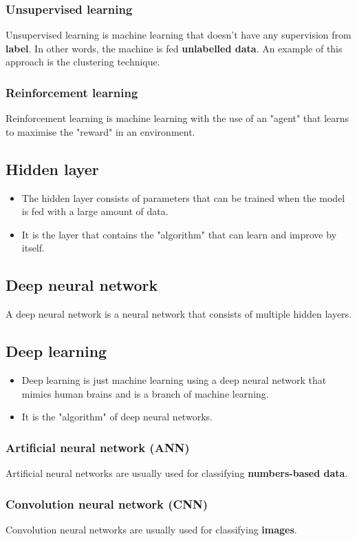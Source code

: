 \documentclass[11pt]{article}
\begin{document}
\subsubsection{Unsupervised learning}
\label{sec:org3e51dc6}
Unsupervised learning is machine learning that doesn't have any supervision from \textbf{label}. In other words, the machine is fed \textbf{unlabelled data}. An example of this approach is the clustering technique.
\subsubsection{Reinforcement learning}
\label{sec:org2c93f9f}
Reinforcement learning is machine learning with the use of an "agent" that learns to maximise the "reward" in an environment.
\subsection{Hidden layer}
\label{sec:org860e4af}
\begin{itemize}
\item The hidden layer consists of parameters that can be trained when the model is fed with a large amount of data.
\item It is the layer that contains the "algorithm" that can learn and improve by itself.
\end{itemize}
\subsection{Deep neural network}
\label{sec:org172271e}
A deep neural network is a neural network that consists of multiple hidden layers.
\subsection{Deep learning}
\label{sec:orgf9fda1c}
\begin{itemize}
\item Deep learning is just machine learning using a deep neural network that mimics human brains and is a branch of machine learning.
\item It is the "algorithm" of deep neural networks.
\end{itemize}
\subsubsection{Artificial neural network (ANN)}
\label{sec:org6db3540}
Artificial neural networks are usually used for classifying \textbf{numbers-based data}.
\subsubsection{Convolution neural network (CNN)}
\label{sec:orge7d789e}
Convolution neural networks are usually used for classifying \textbf{images}.
\end{document}
